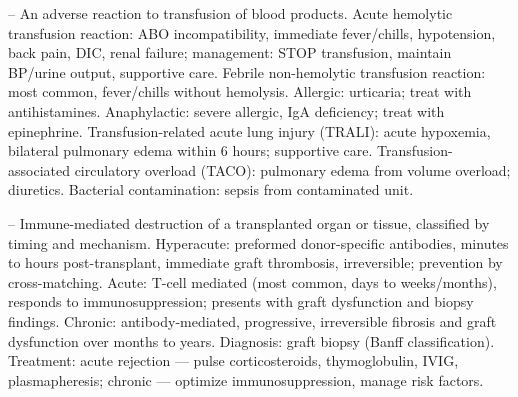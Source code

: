 -- An adverse reaction to transfusion of blood products. Acute hemolytic transfusion reaction: ABO incompatibility, immediate fever/chills, hypotension, back pain, DIC, renal failure; management: STOP transfusion, maintain BP/urine output, supportive care. Febrile non-hemolytic transfusion reaction: most common, fever/chills without hemolysis. Allergic: urticaria; treat with antihistamines. Anaphylactic: severe allergic, IgA deficiency; treat with epinephrine. Transfusion-related acute lung injury (TRALI): acute hypoxemia, bilateral pulmonary edema within 6 hours; supportive care. Transfusion-associated circulatory overload (TACO): pulmonary edema from volume overload; diuretics. Bacterial contamination: sepsis from contaminated unit.

-- Immune-mediated destruction of a transplanted organ or tissue, classified by timing and mechanism. Hyperacute: preformed donor-specific antibodies, minutes to hours post-transplant, immediate graft thrombosis, irreversible; prevention by cross-matching. Acute: T-cell mediated (most common, days to weeks/months), responds to immunosuppression; presents with graft dysfunction and biopsy findings. Chronic: antibody-mediated, progressive, irreversible fibrosis and graft dysfunction over months to years. Diagnosis: graft biopsy (Banff classification). Treatment: acute rejection — pulse corticosteroids, thymoglobulin, IVIG, plasmapheresis; chronic — optimize immunosuppression, manage risk factors.

